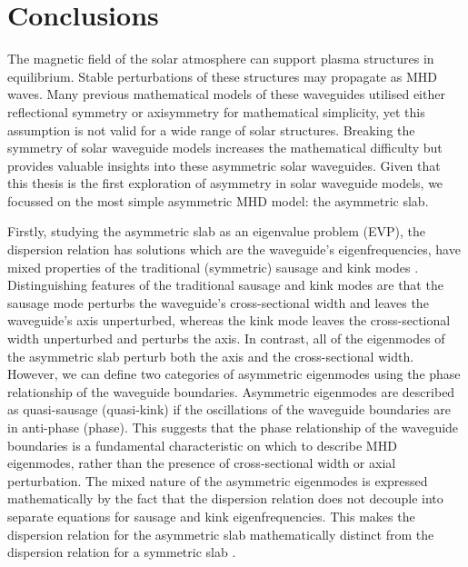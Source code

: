 \chapter{Conclusions}
\label{chap: conclusion}

The magnetic field of the solar atmosphere can support plasma structures in equilibrium. Stable perturbations of these structures may propagate as MHD waves. Many previous mathematical models of these waveguides utilised either reflectional symmetry or axisymmetry for mathematical simplicity, yet this assumption is not valid for a wide range of solar structures. Breaking the symmetry of solar waveguide models increases the mathematical difficulty but provides valuable insights into these asymmetric solar waveguides. Given that this thesis is the first exploration of asymmetry in solar waveguide models, we focussed on the most simple asymmetric MHD model: the asymmetric slab.

Firstly, studying the asymmetric slab as an eigenvalue problem (EVP), the dispersion relation has solutions which are the waveguide's eigenfrequencies, have mixed properties of the traditional (symmetric) sausage and kink modes \citep{all_etal17}. Distinguishing features of the traditional sausage and kink modes are that the sausage mode perturbs the waveguide's cross-sectional width and leaves the waveguide's axis unperturbed, whereas the kink mode leaves the cross-sectional width unperturbed and perturbs the axis. In contrast, all of the eigenmodes of the asymmetric slab perturb both the axis and the cross-sectional width. However, we can define two categories of asymmetric eigenmodes using the phase relationship of the waveguide boundaries. Asymmetric eigenmodes are described as quasi-sausage (quasi-kink) if the oscillations of the waveguide boundaries are in anti-phase (phase). This suggests that the phase relationship of the waveguide boundaries is a fundamental characteristic on which to describe MHD eigenmodes, rather than the presence of cross-sectional width or axial perturbation.  The mixed nature of the asymmetric eigenmodes is expressed mathematically by the fact that the dispersion relation does not decouple into separate equations for sausage and kink eigenfrequencies. This makes the dispersion relation for the asymmetric slab mathematically distinct from the dispersion relation for a symmetric slab \citep{rob81b,edw_etal82}.

